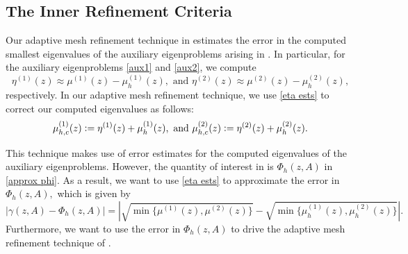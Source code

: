 \subsection{The Inner Refinement Criteria}

Our adaptive mesh refinement technique in  estimates the error in the computed smallest eigenvalues of the auxiliary eigenproblems arising in . In particular, for the auxiliary eigenproblems \eqref{aux1} and \eqref{aux2}, we compute 
\begin{equation} \label{eta ests}
    \eta^{(1)}(z) \approx  \mu^{(1)}(z) - \mu_h^{(1)}(z), \text{ and } \eta^{(2)}(z) \approx  \mu^{(2)}(z) - \mu_h^{(2)}(z),
\end{equation}
respectively. In our adaptive mesh refinement technique, we use \eqref{eta ests} to correct our computed eigenvalues as follows:
\begin{equation} \label{corrected}
    \mu_{h,c} ^{(1)}(z) \vcentcolon=  \eta^{(1)}(z) + \mu_h^{(1)}(z), \text{ and } \mu_{h,c} ^{(2)}(z) \vcentcolon=  \eta^{(2)}(z) + \mu_h^{(2)}(z).
\end{equation}

This technique makes use of error estimates for the computed eigenvalues of the auxiliary eigenproblems. However, the quantity of interest in  is $\Phi_h(z, A)$ in \eqref{approx phi}. As a result, we want to use \eqref{eta ests} to approximate the error in $\Phi_h(z, A),$ which is given by
\begin{equation} \label{phi err}
    | \gamma(z, A) - \Phi_h(z, A)| = \left| \sqrt{ \min \{ \mu^{(1)}(z), \mu^{(2)}(z) \}}  - \sqrt{ \min \{ \mu_h^{(1)}(z), \mu_h^{(2)}(z) \}} \right|.
\end{equation}
Furthermore, we want to use the error in $\Phi_h(z, A)$ to drive the adaptive mesh refinement technique of .

